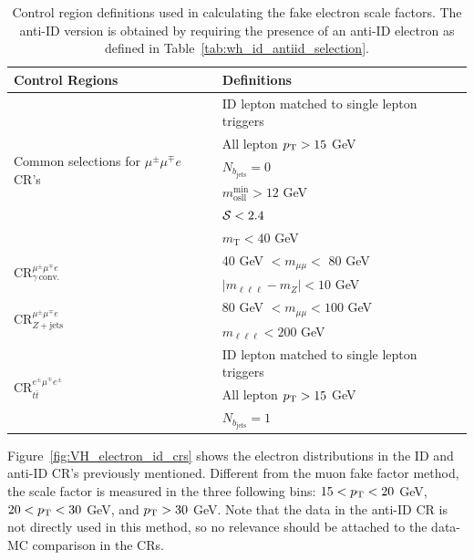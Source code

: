 \begin{table}[htp]
  \centering
  \begin{tabular}{l|l}
    \hline
    \textbf{Control Regions} & \textbf{Definitions} \\
    \hline
    \hline
    \multirow{6}{*}{Common selections for $\mu^{\pm}\mu^{\mp}e$ CR's}
      & ID lepton matched to single lepton triggers \\
      & All lepton $p_{\mathrm{T}} > 15$ GeV \\
      & $N_{b_{\mathrm{jets}}} = 0$ \\
      & $m^{\mathrm{min}}_{\mathrm{osll}} > 12$ GeV \\
      & $\mathcal{S} < 2.4$ \\
      & $m_{\mathrm{T}} < 40$ GeV \\
      \hline
    \multirow{2}{*}{$\mathrm{CR}^{\mu^{\pm}\mu^{\mp} e}_{\gamma~\mathrm{conv.}}$} & 40 GeV $< m_{\mu\mu} <$ 80 GeV \\
     & $|m_{\ell\ell\ell} - m_{Z}| < 10$ GeV \\
    \hline
    \multirow{2}{*}{$\mathrm{CR}^{\mu^{\pm}\mu^{\mp} e}_{Z+\mathrm{jets}}$} & 80 GeV $< m_{\mu\mu} < 100$ GeV \\
    & $m_{\ell\ell\ell} < 200$ GeV \\
    \hline
    \multirow{3}{*}{$\mathrm{CR}^{e^{\pm}\mu^{\mp}e^{\pm}}_{t\bar{t}}$} & ID lepton matched to single lepton triggers \\
    & All lepton $p_{\mathrm{T}} > 15$ GeV \\
    & $N_{b_{\mathrm{jets}}} = 1$ \\
    \hline
  \end{tabular}
  \caption{Control region definitions used in calculating the fake electron scale factors. The anti-ID version is obtained by requiring the presence of an anti-ID electron as defined in Table~\ref{tab:wh_id_antiid_selection}.}\label{tab:wh_electron_id_antiid_selection}
\end{table}

Figure~\ref{fig:VH_electron_id_crs} shows the electron \pt{} distributions in the ID and anti-ID CR's previously mentioned. Different from the muon fake factor method, the scale factor is measured in the three following \pt{} bins: $15 < p_{\mathrm{T}} < 20$ GeV, $20 < p_{\mathrm{T}} < 30$ GeV, and $p_{\mathrm{T}} > 30$ GeV. Note that the data in the anti-ID CR is not directly used in this method, so no relevance should be attached to the data-MC comparison in the CRs.

